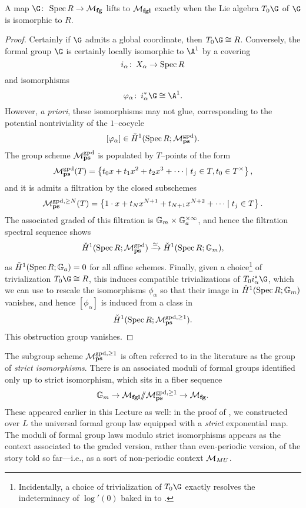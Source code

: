 \begin{lemma}\label{CoordinatizbleFGs}
A map \(\G\co \Spec R \to \moduli{fg}\) lifts to \(\mathcal{M}_{\mathbf{fgl}}\) exactly when the Lie algebra \(T_0 \G\) of \(\G\) is isomorphic to \(R\).
\end{lemma}
\begin{proof}
Certainly if \(\G\) admits a global coordinate, then \(T_0 \G \cong R\).  Conversely, the formal group \(\G\) is certainly locally isomorphic to \(\A^1\) by a covering \[i_\alpha\colon\thinspace X_\alpha \to \operatorname{Spec} R\] and isomorphisms \[\phi_\alpha\co i_\alpha^* \G \cong \A^1.\]  However, \textit{a priori}, these isomorphisms may not glue, corresponding to the potential nontriviality of the {\Cech} \(1\)--cocycle \[[\varphi_\alpha] \in \check{H}^1(\operatorname{Spec} R; \mathcal{M}_{\mathbf{ps}}^{\mathrm{gpd}}).\]  The group scheme \(\mathcal{M}_{\mathbf{ps}}^{\mathrm{gpd}}\) is populated by \(T\)--points of the form \[\mathcal{M}_{\mathbf{ps}}^{\mathrm{gpd}}(T) = \left\{ t_0 x + t_1 x^2 + t_2 x^3 + \cdots \mid t_j \in T, t_0 \in T^\times \right\},\] and it is admits a filtration by the closed subschemes \[\mathcal{M}_{\mathbf{ps}}^{\mathrm{gpd}, \ge N}(T) = \left\{ 1 \cdot x + t_N x^{N+1} + t_{N+1} x^{N+2} + \cdots \mid t_j \in T \right\}.\]  The associated graded of this filtration is \(\mathbb G_m \times \mathbb G_a^{\times \infty}\), and hence the filtration spectral sequence shows \[\check{H}^1(\operatorname{Spec} R; \mathcal{M}_{\mathbf{ps}}^{\mathrm{gpd}}) \xrightarrow{\simeq} \check{H}^1(\operatorname{Spec} R; \mathbb G_m),\] as \(\check{H}^1(\operatorname{Spec} R; \mathbb G_a) = 0\) for all affine schemes.  Finally, given a choice\footnote{Incidentally, a choice of trivialization of \(T_0 \G\) exactly resolves the indeterminacy of \(\log'(0)\) baked in to .} of trivialization \(T_0 \G \cong R\), this induces compatible trivializations of \(T_0 i_\alpha^* \G\), which we can use to rescale the isomorphisms \(\phi_\alpha\) so that their image in \(\check{H}^1(\operatorname{Spec} R; \mathbb G_m)\) vanishes, and hence \([\phi_\alpha]\) is induced from a class in \[\check{H}^1(\operatorname{Spec} R; \mathcal{M}_{\mathbf{ps}}^{\mathrm{gpd}, \ge 1}).\]  This obstruction group vanishes.
\end{proof}

\begin{remark}\label{StrictIsosRemark}
The subgroup scheme \(\mathcal{M}_{\mathbf{ps}}^{\mathrm{gpd}, \ge 1}\) is often referred to in the literature as the group of \textit{strict isomorphisms}.  There is an associated moduli of formal groups identified only up to strict isomorphism, which sits in a fiber sequence \[\mathbb G_m \to \mathcal{M}_{\mathbf{fgl}} /\!\!/ \mathcal{M}_{\mathbf{ps}}^{\mathrm{gpd}, \ge 1} \to \mathcal{M}_{\mathbf{fg}}.\]  These appeared earlier in this Lecture as well: in the proof of , we constructed over \(L\) the universal formal group law equipped with a \emph{strict} exponential map.  The moduli of formal group laws modulo strict isomorphisms appears as the context associated to the graded version, rather than even-periodic version, of the story told so far---i.e., as a sort of non-periodic context \(\mathcal{M}_{MU}\).
\end{remark}












